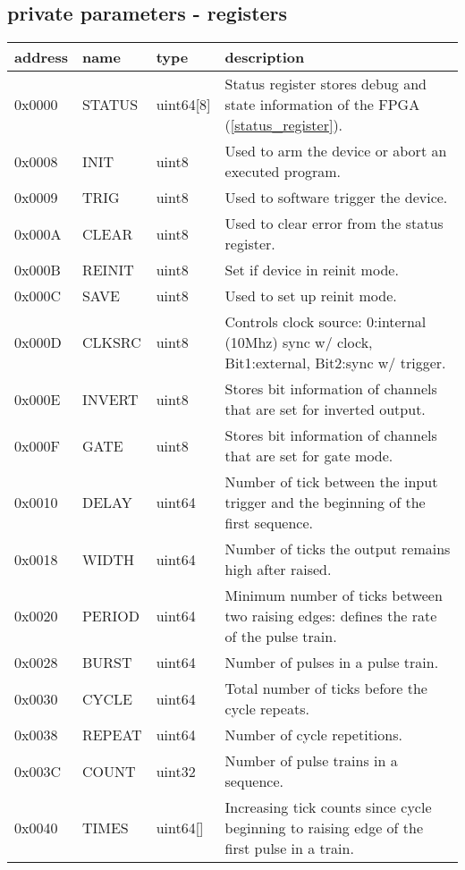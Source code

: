 \documentclass{article}
\begin{document}
\subsection*{private parameters - registers}
\begin{tabular}{llll}
address&name&type&description\\\hline
0x0000&STATUS&uint64[8]&Status register stores debug and state information of the FPGA (\autoref{status_register}).\\
0x0008&INIT&uint8&Used to arm the device or abort an executed program.\\
0x0009&TRIG&uint8&Used to software trigger the device.\\
0x000A&CLEAR&uint8&Used to clear error from the status register.\\
0x000B&REINIT&uint8&Set if device in reinit mode.\\
0x000C&SAVE&uint8&Used to set up reinit mode.\\
0x000D&CLKSRC&uint8&Controls clock source: 0:internal (10Mhz) sync w/ clock, Bit1:external, Bit2:sync w/ trigger.\\
0x000E&INVERT&uint8&Stores bit information of channels that are set for inverted output.\\
0x000F&GATE&uint8&Stores bit information of channels that are set for gate mode.\\
0x0010&DELAY&uint64&Number of tick between the input trigger and the beginning of the first sequence.\\
0x0018&WIDTH&uint64&Number of ticks the output remains high after raised.\\
0x0020&PERIOD&uint64&Minimum number of ticks between two raising edges: defines the rate of the pulse train.\\
0x0028&BURST&uint64&Number of pulses in a pulse train.\\
0x0030&CYCLE&uint64&Total number of ticks before the cycle repeats.\\
0x0038&REPEAT&uint64&Number of cycle repetitions.\\
0x003C&COUNT&uint32&Number of pulse trains in a sequence.\\
0x0040&TIMES&uint64[]&Increasing tick counts since cycle beginning to raising edge of the first pulse in a train.\\
\end{tabular}
\end{document}
